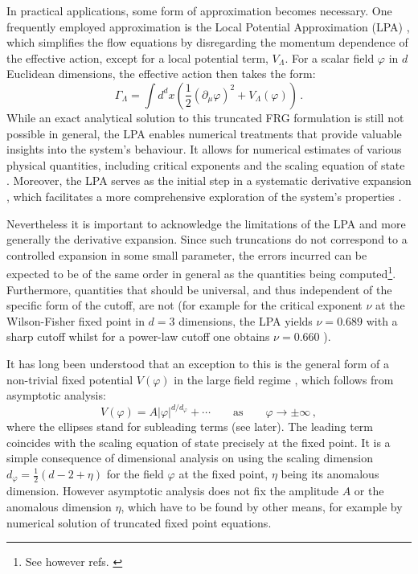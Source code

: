 \documentclass[11pt,a4paper]{article}
\numberwithin{figure}{section}
\numberwithin{equation}{section}
\newcommand{\be}{\begin{equation}}
\newcommand{\ee}{\end{equation}}
\newcommand{\ph}{\varphi}
\begin{document}
In practical applications, some form of approximation becomes necessary. One frequently employed approximation is the Local Potential Approximation (LPA) \cite{Nicoll:1974zz,Hasenfratz:1985dm,Felder:1987,Ball:1994ji,Morris:1994ki,Morris:1995af,Aoki:1996fn,Comellas:1997tf,Osborn:2009vs,Bervillier:2013hha}, which simplifies the flow equations by disregarding the momentum dependence of the effective action, except for a local potential term, $V_\Lambda$. For a scalar field $\ph$ in $d$ Euclidean dimensions, the effective action then takes the form:
\begin{equation}
    \Gamma_\Lambda=\int\!\! d^dx \left(\frac{1}{2}(\partial_\mu \ph)^2+ V_\Lambda(\ph)\right) \,.
\end{equation}
While an exact analytical solution to this truncated FRG formulation is still not possible in general, the LPA enables numerical treatments that provide valuable insights into the system's behaviour. It allows for numerical estimates of various physical quantities, including critical exponents and the scaling equation of state \cite{Morris:1994ki,Morris:1994ie,Morris:1996xq,Morris:1997xj,Morris:1998,Bagnuls:2000,Berges:2000ew,Pelissetto:2000ek,Rosten:2010vm,Dupuis:2020fhh}. Moreover, the LPA serves as the initial step in a systematic derivative expansion \cite{Morris:1994ki,Morris:1994ie,Morris:1996xq,Morris:1997xj,Morris:1998}, which facilitates a more comprehensive exploration of the system's properties \cite{Morris:1996xq,Morris:1998,Bagnuls:2000,Berges:2000ew,Pelissetto:2000ek,Rosten:2010vm,Dupuis:2020fhh}.

Nevertheless it is important to acknowledge the limitations of the LPA and more generally the derivative expansion. Since such truncations do not correspond to a controlled expansion in some small parameter, the errors incurred can be expected to be of the same order in general as the quantities being computed\footnote{See however refs. \cite{DePolsi:2020pjk,DePolsi:2021cmi,DePolsi:2022wyb,Balog:2019rrg}}. Furthermore, quantities that should be universal, and thus independent of the specific form of the cutoff, are not (for example for the critical exponent $\nu$ at the Wilson-Fisher fixed point in $d=3$ dimensions,  the LPA yields $\nu=0.689$ with a sharp cutoff \cite{Morris:1994ki} whilst for a power-law cutoff one obtains $\nu=0.660$ \cite{Morris:1994ie}).

It has long been understood that an exception to this is the general form of a non-trivial fixed potential $V(\ph)$ in the large field regime \cite{Morris:1994ki,Morris:1994ie,Morris:1997xj,Morris:1998}, which follows from asymptotic analysis:
\be \label{asympV} V(\ph) = A|\ph|^{d/d_\ph}+\cdots\qquad\text{as}\qquad \ph\to\pm\infty\,, \ee
where the ellipses stand for subleading terms (see later).
The leading term coincides with the scaling equation of state precisely at the fixed point. It is a simple consequence of dimensional analysis on using the scaling dimension $d_\ph =\frac12(d-2+\eta)$ for the field $\ph$ at the fixed point, $\eta$ being its anomalous dimension. However asymptotic analysis does not fix the amplitude
$A$ or the anomalous dimension $\eta$, which have to be found by other means, for example by numerical solution of truncated fixed point equations. 
\end{document}
